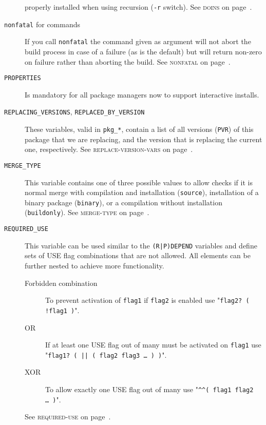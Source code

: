 \documentclass[a4paper]{leaflet}
\newcommand{\code}[1]{\texttt{#1}}
\newcommand{\featureref}[1]{\textsc{#1} on page~\pageref{feat:#1}}
\begin{document}
\begin{description}
    properly installed when using recursion (\code{-r} switch).
    See \featureref{doins}.
    \item[\code{nonfatal} for commands] If you call \code{nonfatal}
    the command given as argument will not abort the build process in
    case of a failure (as is the default) but will return non-zero on
    failure rather than aborting the build.
    See \featureref{nonfatal}.
    \item[\code{PROPERTIES}] Is mandatory for all package managers now
    to support interactive installs.
    \item[\code{REPLACING\_VERSIONS}, \code{REPLACED\_BY\_VERSION}]
    These variables, valid in \code{pkg\_*}, contain a list of all
    versions (\code{PVR}) of this package that we are replacing, and
    the version that is replacing the current one, respectively.
    See \featureref{replace-version-vars}.
    \item[\code{MERGE\_TYPE}] This variable contains one of three
    possible values to allow checks if it is normal merge with
    compilation and installation (\code{source}), installation of a
    binary package (\code{binary}), or a compilation without
    installation (\code{buildonly}).  See \featureref{merge-type}.
    \item[\code{REQUIRED\_USE}] This variable can be used similar to
    the \code{(R|P)DEPEND} variables and define sets of USE flag
    combinations that are not allowed.  All elements can be further
    nested to achieve more functionality.
    \begin{description}
        \item[Forbidden combination] To prevent activation of
        \code{flag1} if \code{flag2} is enabled use
        "\code{flag2? ( !flag1 )}".
        \item[OR] If at least one USE flag out of many must be
        activated on \code{flag1} use
        "\code{flag1? ( || ( flag2 flag3 \dots\ ) )}".
        \item[XOR] To allow exactly one USE flag out of many use
        "\code{\textasciicircum\textasciicircum ( flag1 flag2 \dots\ )}".
    \end{description}
    See \featureref{required-use}.
\end{description}
\end{document}
